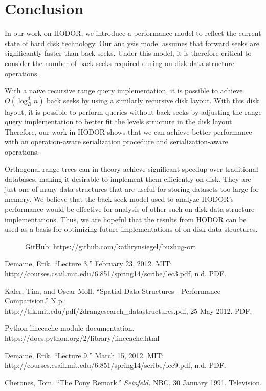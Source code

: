 \documentclass[11pt, oneside]{article}
\begin{document}
\section{Conclusion}

In our work on HODOR, we introduce a performance model to reflect the current
state of hard disk technology.  Our analysis model assumes that forward seeks
are significantly faster than back seeks. Under this model, it is therefore
critical to consider the number of back seeks required during on-disk data
structure operations. 

With a na{\"i}ve recursive range query implementation, it is possible to achieve
$O(\log_B^d n)$ back seeks by using a similarly recursive disk layout. With this
disk layout, it is possible to perform queries without back seeks by adjusting
the range query implementation to better fit the levels structure in the disk
layout. Therefore, our work in HODOR shows that we can achieve better
performance with an operation-aware serialization procedure and
serialization-aware operations. 

Orthogonal range-trees can in theory achieve significant speedup over
traditional databases, making it desirable to implement them efficiently
on-disk. They are just one of many data structures that are useful for storing
datasets too large for memory. We believe that the back seek model used to
analyze HODOR's performance would be effective for analysis of other such
on-disk data structure implementations. Thus, we are hopeful that the results
from HODOR can be used as a basis for optimizing future implementations of
on-disk data structures. 

\begin{figure}[b]
    GitHub: https://github.com/kathrynsiegel/buzhug-ort
\end{figure}

\newpage

\begin{thebibliography}{1}
    
     Demaine, Erik. ``Lecture 3,'' February 23, 2012.  MIT: \\
        http://courses.csail.mit.edu/6.851/spring14/scribe/lec3.pdf, n.d. PDF.

     Kaler, Tim, and Oscar Moll. ``Spatial Data Structures -
        Performance Comparision.'' N.p.: \\
        http://tfk.mit.edu/pdf/2drangesearch\_datastructures.pdf, 25 May 2012.
        PDF.

     Python linecache module documentation. \\
        https://docs.python.org/2/library/linecache.html 

     Demaine, Erik. ``Lecture 9,'' March 15, 2012. MIT: \\
        http://courses.csail.mit.edu/6.851/spring14/scribe/lec9.pdf, n.d. PDF.

     Cherones, Tom. ``The Pony Remark.'' \textit{Seinfeld.}
        NBC. 30 January 1991. Television.

\end{thebibliography}
\end{document}
